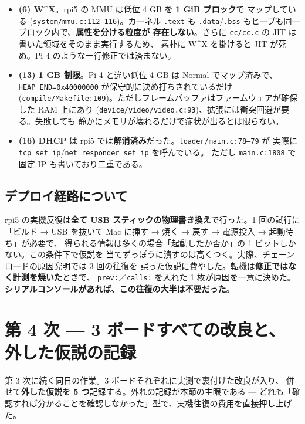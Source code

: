 \documentclass[a4paper,11pt]{ltjsarticle}
\begin{document}
\begin{itemize}[leftmargin=1.4em,itemsep=3pt]
\item \textbf{(6) W\textasciicircum X}。rpi5 の MMU は低位 4 GB を \textbf{1 GiB ブロック}で
      マップしている (\texttt{system/mmu.c:112--116})。カーネル \texttt{.text} も
      \texttt{.data}/\texttt{.bss} もヒープも同一ブロック内で、\textbf{属性を分ける粒度が
      存在しない}。さらに \texttt{cc/cc.c} の JIT は書いた領域をそのまま実行するため、
      素朴に W\textasciicircum X を掛けると JIT が死ぬ。Pi 4 のような一行修正では済まない。
\item \textbf{(13) 1 GB 制限}。Pi 4 と違い低位 4 GB は Normal でマップ済みで、
      \texttt{HEAP\_END=0x40000000} が保守的に決め打ちされているだけ
      (\texttt{compile/Makefile:109})。ただしフレームバッファはファームウェアが確保した
      RAM 上にあり (\texttt{device/video/video.c:93})、拡張には衝突回避が要る。失敗しても
      静かにメモリが壊れるだけで症状が出るとは限らない。
\item \textbf{(16) DHCP} は rpi5 では\textbf{解消済み}だった。\texttt{loader/main.c:78--79} が
      実際に \texttt{tcp\_set\_ip}/\texttt{net\_responder\_set\_ip} を呼んでいる。
      ただし \texttt{main.c:1808} で固定 IP も書いており二重である。
\end{itemize}

\subsection{デプロイ経路について}

rpi5 の実機反復は\textbf{全て USB スティックの物理書き換え}で行った。1 回の試行に
「ビルド → USB を抜いて Mac に挿す → 焼く → 戻す → 電源投入 → 起動待ち」が必要で、
得られる情報は多くの場合「起動したか否か」の 1 ビットしかない。この条件下で仮説を
当てずっぽうに潰すのは高くつく。実際、チェーンロードの原因究明では 3 回の往復を
誤った仮説に費やした。転機は\textbf{修正ではなく計測を焼いた}ときで、
\texttt{prev:}／\texttt{calls:} を入れた 1 枚が原因を一意に決めた。
\textbf{シリアルコンソールがあれば、この往復の大半は不要だった}。

\section{第 4 次 --- 3 ボードすべての改良と、外した仮説の記録}

第 3 次に続く同日の作業。3 ボードそれぞれに実測で裏付けた改良が入り、
併せて\textbf{外した仮説を 5 つ}記録する。外れの記録が本節の主眼である ---
どれも「確認すれば分かることを確認しなかった」型で、実機往復の費用を直接押し上げた。
\end{document}
